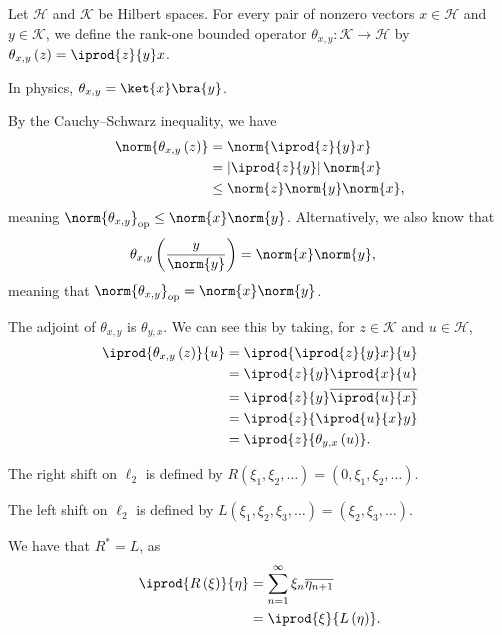 \documentclass[10pt]{mypackage}
\begin{document}
\begin{example}
  Let $\mathcal{H}$ and $\mathcal{K}$ be Hilbert spaces. For every pair of nonzero vectors $x\in \mathcal{H}$ and $y\in \mathcal{K}$, we define the rank-one bounded operator $\theta_{x,y}: \mathcal{K}\rightarrow \mathcal{H}$ by $\theta_{x,y}\left(z\right) = \iprod{z}{y}x$.\newline

  In physics, $\theta_{x,y} = \ket{x}\bra{y}$.\newline

  By the Cauchy--Schwarz inequality, we have
  \begin{align*}
    \norm{\theta_{x,y}\left(z\right)} &= \norm{\iprod{z}{y}x}\\
                                      &= \left\vert \iprod{z}{y} \right\vert \norm{x}\\
                                      &\leq \norm{z}\norm{y}\norm{x},
  \end{align*}
  meaning $\norm{\theta_{x,y}}_{\text{op}} \leq \norm{x}\norm{y}$. Alternatively, we also know that
  \begin{align*}
    \theta_{x,y}\left(\frac{y}{\norm{y}}\right) &= \norm{x}\norm{y},
  \end{align*}
  meaning that $\norm{\theta_{x,y}}_{\text{op}} = \norm{x}\norm{y}$.\newline

  The adjoint of $\theta_{x,y}$ is $\theta_{y,x}$. We can see this by taking, for $z\in \mathcal{K}$ and $u\in \mathcal{H}$,
  \begin{align*}
    \iprod{\theta_{x,y}\left(z\right)}{u} &= \iprod{ \iprod{z}{y}x }{u}\\
                                          &= \iprod{z}{y} \iprod{x}{u}\\
                                          &= \iprod{z}{y} \overline{\iprod{u}{x}}\\
                                          &= \iprod{z}{ \iprod{u}{x}y }\\
                                          &= \iprod{z}{ \theta_{y,x}\left(u\right) }.
  \end{align*}
\end{example}
\begin{example}
  The right shift on $\ell_2$ is defined by $R\left(\xi_1,\xi_2,\dots\right) = \left(0,\xi_1,\xi_2,\dots\right)$.\newline

  The left shift on $\ell_2$ is defined by $L\left(\xi_1,\xi_2,\xi_3,\dots\right) = \left(\xi_2,\xi_3,\dots\right)$.\newline

  We have that $R^{\ast} = L$, as
  \begin{align*}
    \iprod{R\left(\xi\right)}{\eta} &= \sum_{n=1}^{\infty}\xi_n \overline{\eta_{n+1}}\\
                                    &= \iprod{\xi}{L\left(\eta\right)}.
  \end{align*}

\end{example}
\end{document}
